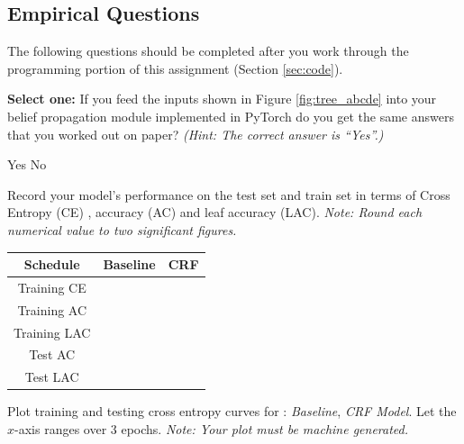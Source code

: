 \documentclass[11pt,addpoints,answers]{exam}
\numberwithin{equation}{section} %
\numberwithin{figure}{section} %
\numberwithin{table}{section} %
\begin{document}
\clearpage
\subsection{Empirical Questions}

The following questions should be completed after you work through the programming portion of this assignment (Section \ref{sec:code}). 

\begin{questions}

\question[1] \textbf{Select one:} If you feed the inputs shown in Figure \ref{fig:tree_abcde} into your belief propagation module implemented in PyTorch do you get the same answers that you worked out on paper? \textit{(Hint: The correct answer is ``Yes''.)}
    \begin{checkboxes}
     \choice Yes
     \choice No
    \end{checkboxes}

\question[10] Record your model's performance on the test set and train set in terms of Cross Entropy (CE) , accuracy (AC) and leaf accuracy (LAC). \emph{Note: Round each numerical value to two significant figures.}


\bgroup
\def\arraystretch{1.5}
\begin{center}
\begin{tabular}{ |c|p{2cm}|p{1cm}| } 
 \hline
 \textbf{Schedule} & \textbf{ Baseline} &  \textbf{CRF } \\
 \hline
Training CE &  & \\ 
 \hline
 Training AC &  &  \\ 
 \hline

Training LAC &  &  \\ 
 \hline

Test AC &  &  \\ 
 \hline

Test LAC &  &  \\ 
 \hline


\end{tabular}
\end{center}
\egroup

\question[10] Plot training and testing cross entropy curves for : \emph{Baseline}, \textit{CRF Model}. Let the $x$-axis ranges over 3 epochs. \emph{Note: Your plot must be machine generated.}

\begin{tcolorbox}[fit,height=12cm, width=15cm, blank, borderline={1pt}{-2pt}]
\end{tcolorbox}
\end{questions}
\end{document}

